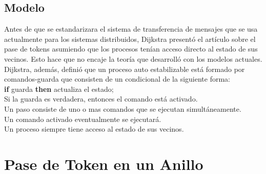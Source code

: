 \documentclass[12pt,a4paper]{article}
\begin{document}
{{}
\subsection{Modelo}{
    Antes de que se estandarizara el sistema de transferencia de mensajes que se usa actualmente para los sistemas distribuidos, Dijkstra presentó el artículo sobre el pase de tokens asumiendo que los procesos tenían acceso directo al estado de sus vecinos. Esto hace que no encaje la teoría que desarrolló con los modelos actuales. \\
    Dijkstra, además, definió que un proceso auto estabilizable está formado por comandos-guarda que consisten de un condicional de la siguiente forma:\\
    \indent\indent \textbf{if} guarda \textbf{then} actualiza el estado; \\
    Si la guarda es verdadera, entonces el comando está activado.\\
    Un paso consiste de uno o mas comandos que se ejecutan simultáneamente.\\
    Un comando activado eventualmente se ejecutará.\\
    Un proceso siempre tiene acceso al estado de sus vecinos.\\

}
}
\section{Pase de Token en un Anillo}{}
\end{document}

